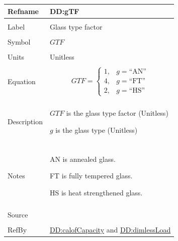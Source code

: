 \documentclass[12pt]{article}
\begin{document}
\vspace{\baselineskip}
\noindent
\begin{minipage}{\textwidth}
\begin{tabular}{>{\raggedright}p{}>{\raggedright\arraybackslash}p{}}
\toprule \textbf{Refname} & \textbf{DD:gTF}
\label{DD:gTF}
\\ \midrule \\
Label & Glass type factor
        
\\ \midrule \\
Symbol & $\mathit{GTF}$
         
\\ \midrule \\
Units & Unitless
        
\\ \midrule \\
Equation & \begin{displaymath}
           \mathit{GTF}=\begin{cases}
                        1, & g=\text{``AN''}\\
                        4, & g=\text{``FT''}\\
                        2, & g=\text{``HS''}
                        \end{cases}
           \end{displaymath}
\\ \midrule \\
Description & \begin{symbDescription}
              \item{$\mathit{GTF}$ is the glass type factor (Unitless)}
              \item{$g$ is the glass type (Unitless)}
              \end{symbDescription}
\\ \midrule \\
Notes & AN is annealed glass.
        
        FT is fully tempered glass.
        
        HS is heat strengthened glass.
        
\\ \midrule \\
Source & \cite{astm2009}
         
\\ \midrule \\
RefBy & \hyperref[DD:calofCapacity]{DD:calofCapacity} and \hyperref[DD:dimlessLoad]{DD:dimlessLoad}
        
\\ \bottomrule
\end{tabular}
\end{minipage}
\end{document}
